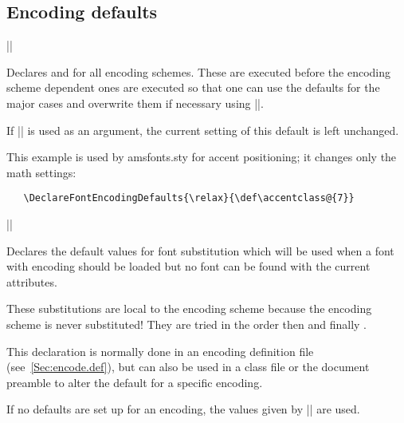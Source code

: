 \documentclass{ltxguide}[1995/11/28]
\begin{document}
\subsection{Encoding defaults} \label{sec:encoding-defaults}

\begin{decl}
  |\DeclareFontEncodingDefaults|  
\end{decl}

Declares  and  for all encoding
schemes.  These are executed before the encoding scheme dependent ones
are executed so that one can use the defaults for the major cases and
overwrite them if necessary using |\DeclareFontEncoding|.

If |\relax| is used as an argument, the current setting of this default
is left unchanged.

This example is used by amsfonts.sty for accent positioning; it changes
only the math settings:
\begin{verbatim}
   \DeclareFontEncodingDefaults{\relax}{\def\accentclass@{7}}
\end{verbatim}


\begin{decl}
  |\DeclareFontSubstitution|    
\end{decl}

Declares the default values for font substitution which will be used
when a font with encoding  should be loaded but no font can
be found with the current attributes.

These substitutions are local to the encoding scheme because the
encoding scheme is never substituted!  They are tried in the order
 then  and finally .

This declaration is normally done in an encoding definition file
(see~\ref{Sec:encode.def}), but can also be used in a class file or the
document preamble to alter the default for a specific encoding.

If no defaults are set up for an encoding, the values given by
|\DeclareErrorFont| are used.
\end{document}
